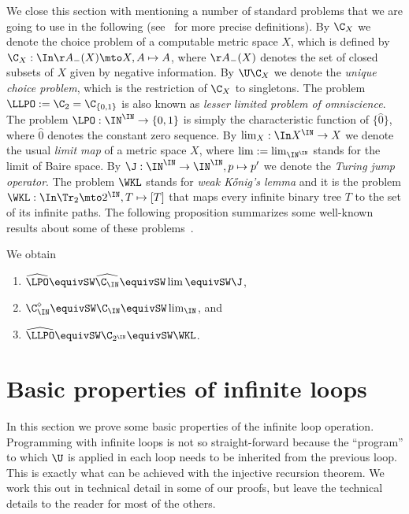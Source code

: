 \documentclass{lmcs}
\begin{document}
\noindent
We close this section with mentioning a number of standard problems that we are going to use in the
following (see~\cite{BGP21} for more precise definitions). 
By $\C_X$ we denote the choice problem of a computable metric space $X$, which is defined
by $\C_X:\In\AA_-(X)\mto X,A\mapsto A$, where $\AA_-(X)$ denotes the set of closed subsets of $X$
given by negative information. 
By $\U\C_X$ we denote the {\em unique choice problem}, which is the restriction of $\C_X$ to singletons.
The problem $\LLPO:=\C_2=\C_{\{0,1\}}$ is also known as
{\em lesser limited problem of omniscience}. The problem $\LPO:\IN^\IN\to\{0,1\}$ is simply
the characteristic function of $\{\widehat{0}\}$, where $\widehat{0}$ denotes the constant zero sequence.
By $\lim_X:\In X^\IN\to X$ we denote the usual {\em limit map} of a metric space $X$, where $\lim:=\lim_{\IN^\IN}$
stands for the limit of Baire space. 
By $\J:\IN^\IN\to\IN^\IN,p\mapsto p'$ we denote the {\em Turing jump operator}.
The problem $\WKL$ stands for {\em weak K\H{o}nig's lemma} and it
is the problem $\WKL:\In\Tr_2\mto 2^\IN, T\mapsto [T]$ that maps every infinite binary tree $T$ to the set
of its infinite paths. The following proposition summarizes some well-known results about some of these problems~\cite{BG11,BBP12,BGP21}.

\begin{prop}
\label{prop:classical-problems}
We obtain 
\begin{enumerate}
\item $\widehat{\LPO}\equivSW\widehat{\C_\IN}\equivSW\lim\equivSW\J$, 
\item $\C_\IN^\diamond\equivSW\C_\IN\equivSW\lim_\IN$, and  
\item $\widehat{\LLPO}\equivSW\C_{2^\IN}\equivSW\WKL$.
\end{enumerate}
\end{prop}


\section{Basic properties of infinite loops}
\label{sec:basic}

In this section we prove some basic properties  of the infinite loop operation.
Programming with infinite loops is not so straight-forward because the ``program'' to which $\U$
is applied in each loop needs to be inherited from the previous loop.
This is exactly what can be achieved with the injective recursion theorem.
We work this out in technical detail in some of our proofs, but leave the technical details
to the reader for most of the others.
\end{document}
